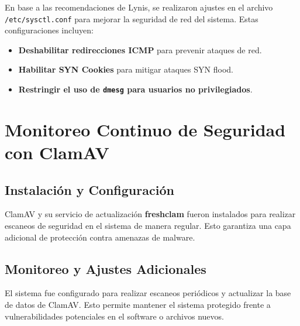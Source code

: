 En base a las recomendaciones de Lynis, se realizaron ajustes en el archivo \texttt{/etc/sysctl.conf} para mejorar la seguridad de red del sistema. Estas configuraciones incluyen:

\begin{itemize}
    \item \textbf{Deshabilitar redirecciones ICMP} para prevenir ataques de red.
    \item \textbf{Habilitar SYN Cookies} para mitigar ataques SYN flood.
    \item \textbf{Restringir el uso de \texttt{dmesg} para usuarios no privilegiados}.
\end{itemize}

\section{Monitoreo Continuo de Seguridad con ClamAV}

\subsection{Instalación y Configuración}
ClamAV y su servicio de actualización \textbf{freshclam} fueron instalados para realizar escaneos de seguridad en el sistema de manera regular. Esto garantiza una capa adicional de protección contra amenazas de malware.

\subsection{Monitoreo y Ajustes Adicionales}
El sistema fue configurado para realizar escaneos periódicos y actualizar la base de datos de ClamAV. Esto permite mantener el sistema protegido frente a vulnerabilidades potenciales en el software o archivos nuevos.
